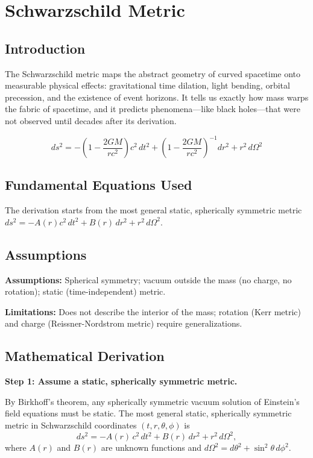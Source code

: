 \chapter{Schwarzschild Metric}

\section*{Introduction}

The Schwarzschild metric maps the abstract geometry of curved spacetime onto measurable physical effects: gravitational time dilation, light bending, orbital precession, and the existence of event horizons. It tells us exactly how mass warps the fabric of spacetime, and it predicts phenomena---like black holes---that were not observed until decades after its derivation.


\begin{equation}
ds^2 = -\left(1 - \frac{2GM}{rc^2}\right)c^2\,dt^2 + \left(1 - \frac{2GM}{rc^2}\right)^{-1}dr^2 + r^2\,d\Omega^2
\end{equation}

\section*{Fundamental Equations Used}

The derivation starts from the most general static, spherically symmetric metric $ds^2 = -A(r)c^2\,dt^2 + B(r)\,dr^2 + r^2\,d\Omega^2$.

\section*{Assumptions}

\textbf{Assumptions:} Spherical symmetry; vacuum outside the mass (no charge, no rotation); static (time-independent) metric.


\textbf{Limitations:} Does not describe the interior of the mass; rotation (Kerr metric) and charge (Reissner-Nordstrom metric) require generalizations.


\section*{Mathematical Derivation}

\textbf{Step 1: Assume a static, spherically symmetric metric.}

By Birkhoff's theorem, any spherically symmetric vacuum solution of Einstein's field equations must be static. The most general static, spherically symmetric metric in Schwarzschild coordinates $(t, r, \theta, \phi)$ is
\begin{equation}
ds^2 = -A(r)\,c^2\,dt^2 + B(r)\,dr^2 + r^2\,d\Omega^2,
\end{equation}
where $A(r)$ and $B(r)$ are unknown functions and $d\Omega^2 = d\theta^2 + \sin^2\theta\,d\phi^2$.

